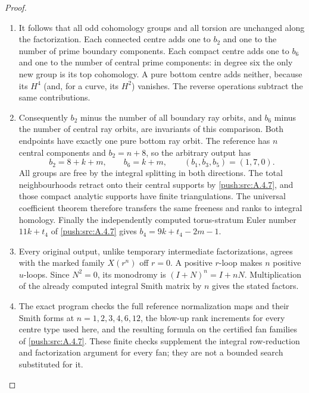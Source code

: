 \begin{proof}
\begin{enumerate}[label=\arabic*.,leftmargin=*]
\item It follows that all odd cohomology groups and all
torsion are unchanged along the factorization. Each
connected centre adds one to $b_2$ and one to the number
of prime boundary components. Each compact centre
adds one to $b_6$ and one to the number of central
prime components: in degree six the only new group
is its top cohomology. A pure bottom centre adds
neither, because its $H^4$ (and, for a curve, its
$H^2$) vanishes. The reverse operations subtract
the same contributions.

\item Consequently $b_2$ minus the number of all boundary
ray orbits, and $b_6$ minus the number of central ray
orbits, are invariants of this comparison. Both
endpoints have exactly one pure bottom ray orbit.
The reference has $n$ central components and
$b_2=n+8$, so the arbitrary output has
\[
 b_2=8+k+m,\qquad b_6=k+m,
 \qquad (b_1,b_3,b_5)=(1,7,0).
\]
All groups are free by the integral splitting in both
directions. The total neighbourhoods retract onto
their central supports by \ref{push:src:A.4.7}, and those compact
analytic supports have finite triangulations. The
universal coefficient theorem therefore transfers
the same freeness and ranks to integral homology.
Finally the independently computed torus-stratum
Euler number $11k+t_4$ of \ref{push:src:A.4.7} gives
$b_4=9k+t_4-2m-1$.

\item Every original output, unlike temporary intermediate
factorizations, agrees with the marked family
$X(r^n)$ off $r=0$. A positive $r$-loop makes $n$
positive $u$-loops. Since $N^2=0$, its monodromy is
$(I+N)^n=I+nN$. Multiplication of the already computed
integral Smith matrix by $n$ gives the stated factors.

\item The exact program 
checks the full reference normalization maps and their
Smith forms at $n=1,2,3,4,6,12$, the blow-up rank
increments for every centre type used here, and the
resulting formula on the certified fan families of
\ref{push:src:A.4.7}. These finite checks supplement the integral
row-reduction and factorization argument for every
fan; they are not a bounded search substituted for it.
\end{enumerate}
\end{proof}

